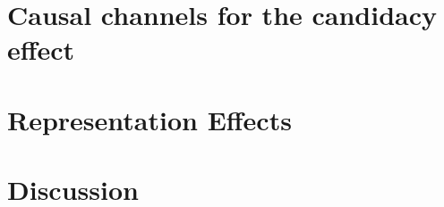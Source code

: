 \documentclass[12pt,letterpaper,oneside]{article}
\begin{document}
\section{Causal channels for the candidacy effect}

\section{Representation Effects}


\section{Discussion}

\newpage


\end{document}
